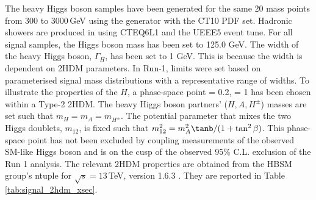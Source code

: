 The heavy Higgs boson samples have been generated for the same 20 mass points from 300 to 3000\,GeV using the \Madgraph generator\cite{MG5aMCatNLO} with the 
CT10 PDF set. Hadronic showers are produced in \herwigpp using CTEQ6L1 and the UEEE5 event tune. 
For all signal samples, the Higgs boson mass has been set to 125.0 GeV. The width of the heavy Higgs boson, $\Gamma_H$, has been set to 1 GeV. This is because the width is dependent on 2HDM parameters. In Run-1, limits were set based on parameterised signal mass distributions with a representative range of widths.
To illustrate the properties of the $H$, a phase-space point \cba = 0.2, \tanb = 1 has been chosen within a Type-2 2HDM. The heavy Higgs boson partners' ($H, A, H^{\pm}$) masses are set such that $m_H = m_A = m_{H^{\pm}}$. The potential parameter that mixes the two Higgs doublets, $m_{12}$, is fixed such that $m_{12}^2 = m_A^2\tanb/(1+\tan^2\beta)$. This phase-space point has not been excluded by coupling measurements of the observed SM-like Higgs boson and is on the cusp of the observed 95\% C.L. exclusion of the Run 1 \Htohhb analysis. The relevant 2HDM properties are obtained from the HBSM group's ntuple for $\sqrt{s} = 13$\,TeV, version 1.6.3 \cite{HBSMNtuple}. They are reported in Table \ref{tab:signal_2hdm_xsec}.


